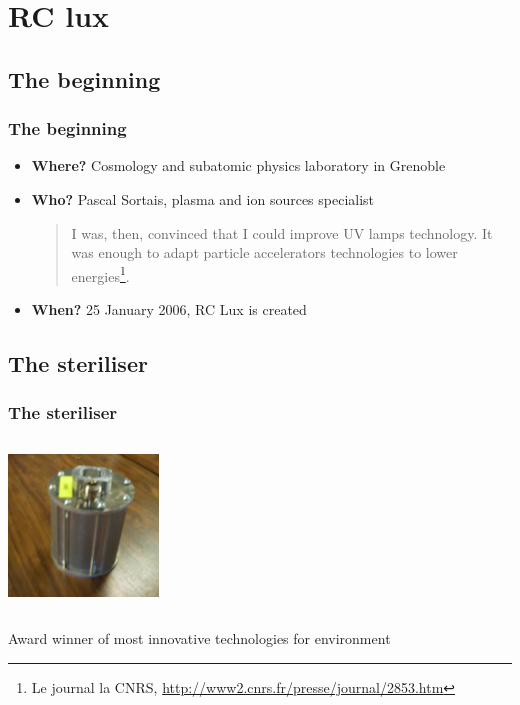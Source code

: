   \section{RC lux}

  \subsection{The beginning}

  \begin{frame}
          \frametitle{The beginning}
  \begin{itemize}[<+->]
  \item \textbf{Where? } Cosmology and subatomic physics laboratory in Grenoble
  \item \textbf{Who? } Pascal Sortais, plasma and ion sources specialist
	\begin{quotation}
	 I was, then, convinced that I could improve UV lamps technology. It was enough to adapt particle accelerators technologies to lower energies\footnote{Le journal la CNRS, \url{http://www2.cnrs.fr/presse/journal/2853.htm}}.
	\end{quotation} 
  \item \textbf{When? } 25 January 2006, RC Lux is created
	\end{itemize}
  \end{frame}

  \subsection{The steriliser}

  \begin{frame}
          \frametitle{The steriliser}
  \includegraphics[height=4.5cm, width=4cm]{images/steriliser.jpg}
\hspace{0.5cm}
\begin{minipage}{0.5\linewidth}
 Award winner of most innovative technologies for environment
\end{minipage}
  

  \end{frame}
